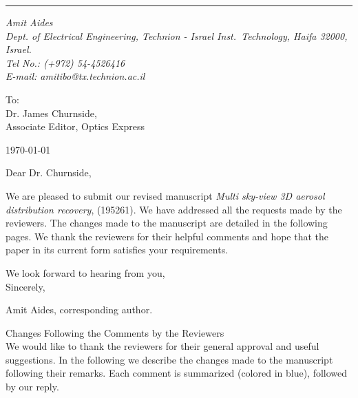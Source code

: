 \documentclass[12pt]{article}
\begin{document}

\vspace*{.5cm} \hrule

\def\sender{
  \it{Amit Aides}\\
  \scriptsize{Dept. of Electrical Engineering, Technion - Israel Inst.~Technology, Haifa 32000, Israel.}\\
  \scriptsize{Tel No.: (+972) 54-4526416}\hspace{5pt}\\
  \scriptsize{E-mail: amitibo@tx.technion.ac.il} } {\sender}

\vspace{0.5cm}
\noindent
To:\\
Dr. James Churnside,\\
Associate Editor, Optics Express\\[0.6cm]

\begin{flushright}
  \today
\end{flushright}

\vspace{0.3cm} \noindent

Dear Dr. Churnside,

We are pleased to submit our revised manuscript {\em Multi sky-view 3D
  aerosol distribution recovery}, (195261).  We have addressed all the
requests made by the reviewers. The changes made to the manuscript are
detailed in the following pages. We thank the reviewers for their
helpful comments and hope that the paper in its current form satisfies
your requirements.

We look forward to hearing from you,\\

\vspace{0.2cm} Sincerely,

\vspace{0.6cm}
Amit Aides, corresponding author.\\

\newpage

{\Large Changes Following the Comments by the Reviewers}\\

We would like to thank the reviewers for their general approval and useful
suggestions. In the following we describe the changes made to the manuscript
following their remarks. Each comment is summarized (colored in
blue), followed by our reply.
\end{document}
